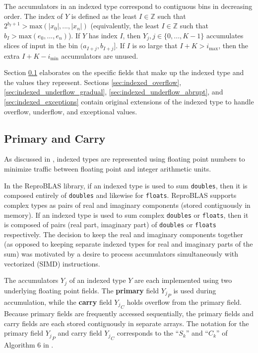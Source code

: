 \documentclass[12pt]{article}
\providecommand{\Z}{\ensuremath{\mathbb{Z}}}
\providecommand{\min}{\ensuremath{\text{min}}}
\providecommand{\max}{\ensuremath{\text{max}}}
\theoremstyle{definition}
\numberwithin{equation}{section}
\numberwithin{figure}{section}
\begin{document}
    The accumulators in an indexed type correspond to contiguous bins in decreasing order. The index of $Y$ is defined as the least $I \in \Z$ such that $2^{b_I + 1} > \max(|x_0|, ..., |x_n|)$ (equivalently, the least $I \in \Z$ such that $b_I > \max(e_0, ..., e_n)$). If $Y$ has index $I$, then $Y_j, j \in \{0, ..., K - 1\}$ accumulates slices of input in the bin $(a_{I + j}, b_{I + j}]$. If $I$ is so large that $I + K > i_{\max}$, then the extra $I + K - i_{\min}$ accumulators are unused.

    Section \ref{sec:indexed_primary_carry} elaborates on the specific fields that make up the indexed type and the values they represent. Sections \ref{sec:indexed_overflow}, \ref{sec:indexed_underflow_gradual}, \ref{sec:indexed_underflow_abrupt}, and \ref{sec:indexed_exceptions} contain original extensions of the indexed type to handle overflow, underflow, and exceptional values.

    \subsection{Primary and Carry}
      \label{sec:indexed_primary_carry}
      As discussed in \cite{repsum}, indexed types are represented using floating point numbers to minimize traffic between floating point and integer arithmetic units.

      In the ReproBLAS library, if an indexed type is used to sum \texttt{doubles}, then it is composed entirely of \texttt{doubles} and likewise for \texttt{floats}. ReproBLAS supports complex types as pairs of real and imaginary components (stored contiguously in memory). If an indexed type is used to sum complex \texttt{doubles} or \texttt{floats}, then it is composed of pairs (real part, imaginary part) of \texttt{doubles} or \texttt{floats} respectively. The decision to keep the real and imaginary components together (as opposed to keeping separate indexed types for real and imaginary parts of the sum) was motivated by a desire to process accumulators simultaneously with vectorized (SIMD) instructions.

      The accumulators $Y_j$ of an indexed type $Y$ are each implemented using two underlying floating point fields. The \textbf{primary} field ${Y_j}_P$ is used during accumulation, while the \textbf{carry} field ${Y_j}_C$ holds overflow from the primary field. Because primary fields are frequently accessed sequentially, the primary fields and carry fields are each stored contiguously in separate arrays. The notation for the primary field ${Y_j}_P$ and carry field ${Y_j}_C$ corresponds to the ``$S_k$'' and ``$C_k$'' of Algorithm $6$ in \cite{repsum}.
\end{document}
